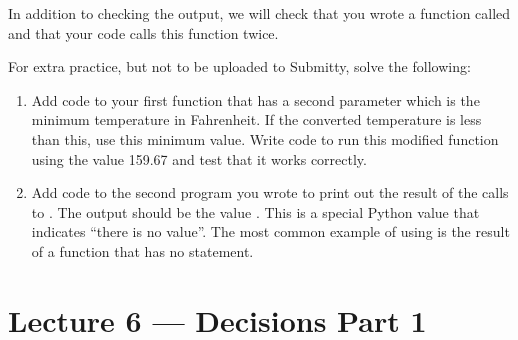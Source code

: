\documentclass[letterpaper,10pt,english]{sphinxmanual}
\begin{document}
\begin{enumerate}
\begin{sphinxVerbatim}[commandchars=\\\{\}]
  
\end{sphinxVerbatim}

In addition to checking the output, we will check that you wrote
a function called  and that your code calls this
function twice.

\end{enumerate}

For extra practice, but not to be uploaded to Submitty, solve the
following:
\begin{enumerate}
\def\theenumi{\arabic{enumi}}
\def\labelenumi{\theenumi .}
\makeatletter\def\p@enumii{\p@enumi \theenumi .}\makeatother
\item {} 
Add code to your first function that has a second parameter which
is the minimum temperature in Fahrenheit.  If the converted
temperature is less than this, use this minimum value.  Write code
to run this modified function using the value 159.67 and test that
it works correctly.

\item {} 
Add code to the second program you wrote to print out the
result of the calls to .  The output should be the value
.  This is a special Python value that indicates “there is
no value”.  The most common example of using  is the
result of a function that has no  statement.

\end{enumerate}


\chapter{Lecture 6 — Decisions Part 1}
\label{\detokenize{lecture_notes/lec06_conditionals1:lecture-6-decisions-part-1}}\label{\detokenize{lecture_notes/lec06_conditionals1::doc}}
\end{document}
